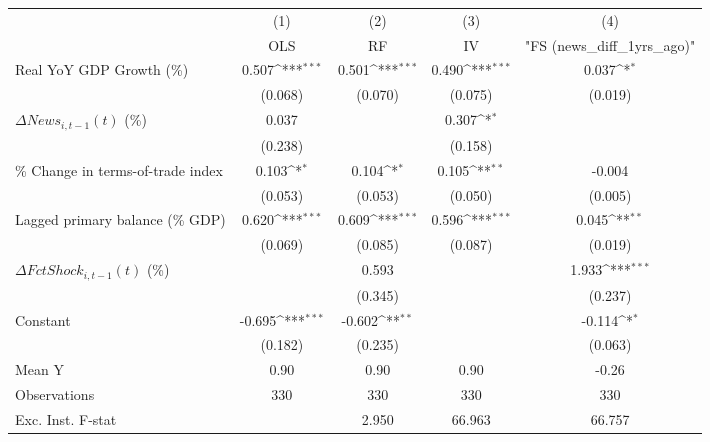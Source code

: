 {
\def\sym#1{\ifmmode^{#1}\else\(^{#1}\)\fi}
\begin{tabular}{l*{4}{c}}
\toprule
                    &\multicolumn{1}{c}{(1)}&\multicolumn{1}{c}{(2)}&\multicolumn{1}{c}{(3)}&\multicolumn{1}{c}{(4)}\\
                    &\multicolumn{1}{c}{OLS}&\multicolumn{1}{c}{RF}&\multicolumn{1}{c}{IV}&\multicolumn{1}{c}{ "FS (news_diff_1yrs_ago)" }\\
\midrule
Real YoY GDP Growth (\%)&       0.507\sym{***}&       0.501\sym{***}&       0.490\sym{***}&       0.037\sym{*}  \\
                    &     (0.068)         &     (0.070)         &     (0.075)         &     (0.019)         \\
\addlinespace
$ \Delta News_{i,t-1}(t)$ (\%)&       0.037         &                     &       0.307\sym{*}  &                     \\
                    &     (0.238)         &                     &     (0.158)         &                     \\
\addlinespace
\% Change in terms-of-trade index&       0.103\sym{*}  &       0.104\sym{*}  &       0.105\sym{**} &      -0.004         \\
                    &     (0.053)         &     (0.053)         &     (0.050)         &     (0.005)         \\
\addlinespace
Lagged primary balance (\% GDP)&       0.620\sym{***}&       0.609\sym{***}&       0.596\sym{***}&       0.045\sym{**} \\
                    &     (0.069)         &     (0.085)         &     (0.087)         &     (0.019)         \\
\addlinespace
$ \Delta FctShock_{i,t-1}(t)$ (\%)&                     &       0.593         &                     &       1.933\sym{***}\\
                    &                     &     (0.345)         &                     &     (0.237)         \\
\addlinespace
Constant            &      -0.695\sym{***}&      -0.602\sym{**} &                     &      -0.114\sym{*}  \\
                    &     (0.182)         &     (0.235)         &                     &     (0.063)         \\
\midrule
Mean Y              &        0.90         &        0.90         &        0.90         &       -0.26         \\
Observations        &         330         &         330         &         330         &         330         \\
Exc. Inst. F-stat   &                     &       2.950         &      66.963         &      66.757         \\
\bottomrule
\end{tabular}
}
